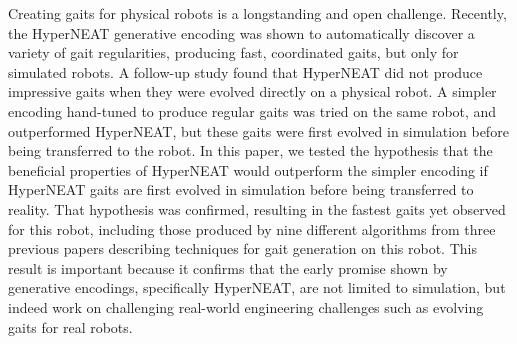 Creating gaits for physical robots is a longstanding and open challenge. 
Recently, the HyperNEAT generative encoding was shown to automatically discover  a variety of gait regularities, producing fast, coordinated gaits, but only for simulated robots. A follow-up study found that HyperNEAT did not produce impressive gaits when they were evolved directly on a physical robot. A simpler encoding hand-tuned to produce regular gaits was tried on the same robot, and outperformed HyperNEAT, but these gaits were first evolved in simulation before being transferred to the robot. In this paper, we tested the hypothesis that the beneficial properties of HyperNEAT would outperform the simpler encoding if HyperNEAT gaits are first evolved in simulation before being transferred to reality. 
That hypothesis was confirmed, resulting in the fastest gaits yet observed for this robot, including those produced by nine different algorithms from three previous papers describing techniques for gait generation on this robot. This result is important because it confirms that the early promise shown by generative encodings, specifically HyperNEAT, are not limited to simulation, but indeed work on challenging real-world engineering challenges such as evolving gaits for real robots. 




%
